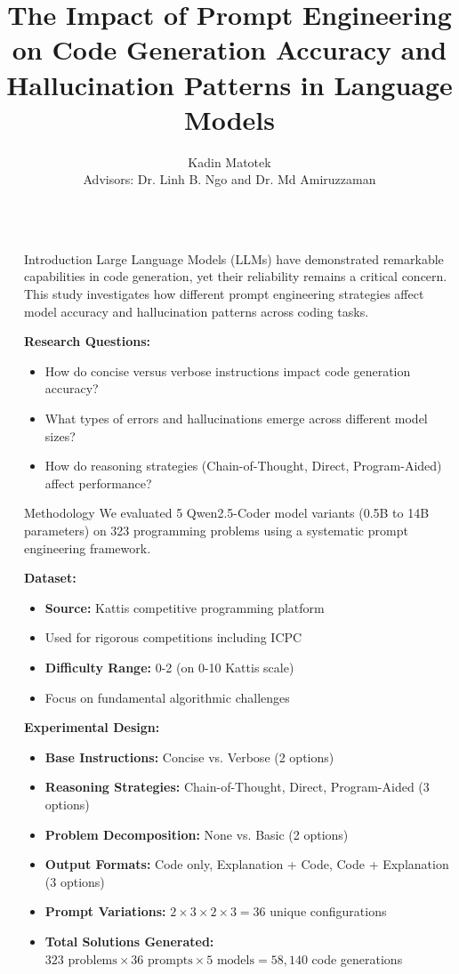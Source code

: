 \documentclass[final]{beamer}
\title{The Impact of Prompt Engineering on Code Generation Accuracy and Hallucination Patterns in Language Models}
\author{Kadin Matotek \texorpdfstring{\\[0.3em] \normalsize Advisors: Dr. Linh B. Ngo and Dr. Md Amiruzzaman}{, Advisor: Dr. Linh B. Ngo and Dr. Md Amiruzzaman}}
\institute[shortinst]{West Chester University, Department of Computer Science}
\newlength{\sepwidth}
\newlength{\colwidth}
\newcommand{\separatorcolumn}{\begin{column}{\sepwidth}\end{column}}
\begin{document}
\begin{frame}[t]
\begin{columns}[t]
\separatorcolumn

\begin{column}{\colwidth}

\begin{block}{Introduction}
Large Language Models (LLMs) have demonstrated remarkable capabilities in code generation, yet their reliability remains a critical concern. This study investigates how different prompt engineering strategies affect model accuracy and hallucination patterns across coding tasks.

\textbf{Research Questions:}
\begin{itemize}
  \item How do concise versus verbose instructions impact code generation accuracy?
  \item What types of errors and hallucinations emerge across different model sizes?
  \item How do reasoning strategies (Chain-of-Thought, Direct, Program-Aided) affect performance?
\end{itemize}
\end{block}

\vspace{-1cm}

\begin{block}{Methodology}
We evaluated 5 Qwen2.5-Coder model variants (0.5B to 14B parameters) on 323 programming problems using a systematic prompt engineering framework.

\textbf{Dataset:}
\vspace{-.5cm}
\begin{itemize}
  \item \textbf{Source:} Kattis competitive programming platform
  \item Used for rigorous competitions including ICPC
  \item \textbf{Difficulty Range:} 0-2 (on 0-10 Kattis scale)
  \item Focus on fundamental algorithmic challenges
\end{itemize}

\textbf{Experimental Design:}
\vspace{-.5cm}
\begin{itemize}
  \item \textbf{Base Instructions:} Concise vs. Verbose (2 options)
  \item \textbf{Reasoning Strategies:} Chain-of-Thought, Direct, Program-Aided (3 options)
  \item \textbf{Problem Decomposition:} None vs. Basic (2 options)
  \item \textbf{Output Formats:} Code only, Explanation + Code, Code + Explanation (3 options)
  \item \textbf{Prompt Variations:} $2 \times 3 \times 2 \times 3 = 36$ unique configurations
  \item \textbf{Total Solutions Generated:} $323 \text{ problems} \times 36 \text{ prompts} \times 5 \text{ models} = 58,140$ code generations
\end{itemize}


\end{block}
\end{column}
\end{columns}
\end{frame}
\end{document}
